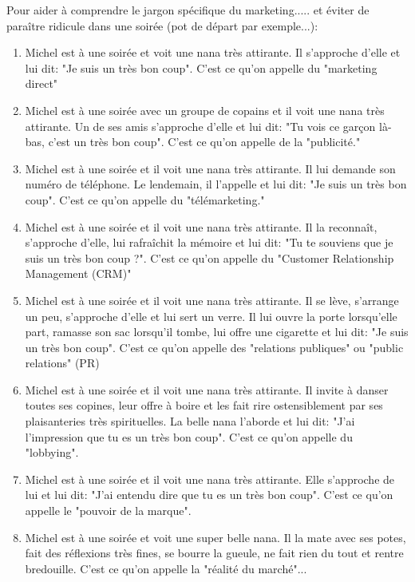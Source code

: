 Pour aider à comprendre le jargon spécifique du marketing..... et éviter de paraître ridicule dans une soirée (pot de départ par exemple...):
\begin{enumerate}
	\item Michel est à une soirée et voit une nana très attirante. Il s'approche d'elle et lui dit: "Je suis un très bon coup". C'est ce qu'on appelle du "marketing direct"

	\item Michel est à une soirée avec un groupe de copains et il voit une nana très attirante. Un de ses amis s'approche d'elle et lui dit: "Tu vois ce garçon là-bas, c'est un très bon coup". C'est ce qu'on appelle de la "publicité."

	\item Michel est à une soirée et il voit une nana très attirante. Il lui demande son numéro de téléphone. Le lendemain, il l'appelle et lui dit: "Je suis un très bon coup". C'est ce qu'on appelle du "télémarketing."

	\item Michel est à une soirée et il voit une nana très attirante. Il la reconnaît, s'approche d'elle, lui rafraîchit la mémoire et lui dit: "Tu te souviens que je suis un très bon coup ?". C'est ce qu'on appelle du "Customer Relationship Management (CRM)"

	\item Michel est à une soirée et il voit une nana très attirante. Il se lève, s'arrange un peu, s'approche d'elle et lui sert un verre. Il lui ouvre la porte lorsqu'elle part, ramasse son sac lorsqu'il tombe, lui offre une cigarette et lui dit: "Je suis un très bon coup". C'est ce qu'on appelle des "relations publiques" ou "public relations" (PR)

	\item Michel est à une soirée et il voit une nana très attirante. Il invite à danser toutes ses copines, leur offre à boire et les fait rire ostensiblement par ses plaisanteries très spirituelles. La belle nana l'aborde et lui dit: "J'ai l'impression que tu es un très bon coup". C'est ce qu'on appelle du "lobbying".

	\item Michel est à une soirée et il voit une nana très attirante. Elle s'approche de lui et lui dit: "J'ai entendu dire que tu es un très bon coup". C'est ce qu'on appelle le "pouvoir de la marque".

	\item Michel est à une soirée et voit une super belle nana. Il la mate avec ses potes, fait des réflexions très fines, se bourre la gueule, ne fait rien du tout et rentre bredouille. C'est ce qu'on appelle la "réalité du marché"...
\end{enumerate}

